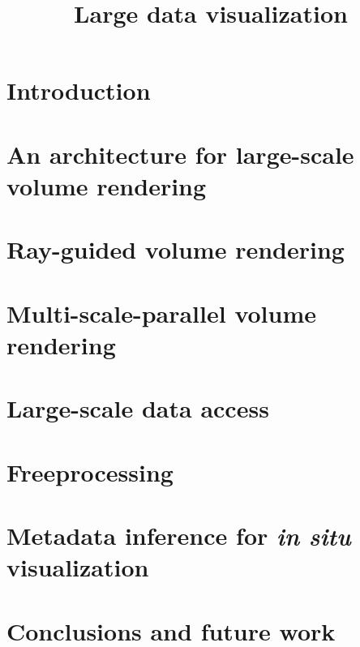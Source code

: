 \documentclass[12pt,twoside,headsepline,titlepage]{thesis}
\title{Large data visualization}
\begin{document}

\newpage

\tableofcontents

\chapter{Introduction}


\chapter[An architecture for volume rendering]{An architecture for large-scale volume rendering}
\label{chp:tuvok}


\chapter{Ray-guided volume rendering}
\label{chp:rayguided}


\chapter{Multi-scale-parallel volume rendering}
\label{chp:multiscale}


\chapter{Large-scale data access}
\label{chp:io}


\chapter{Freeprocessing}
\label{chp:freeprocessing}


\chapter{Metadata inference for \textit{in situ} visualization}
\label{chp:inference}


\chapter{Conclusions and future work}
\label{chp:conclusions}




\end{document}
